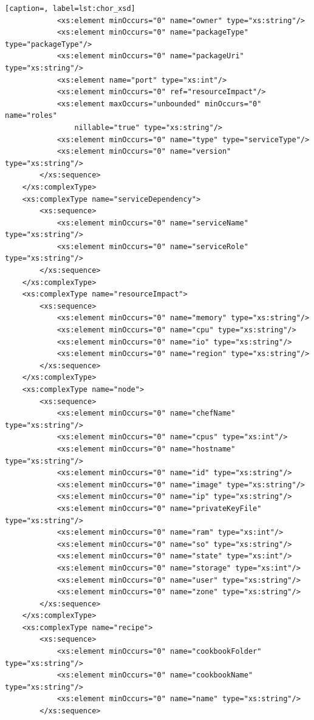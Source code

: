 \documentclass[a4paper, 10pt]{article}
\begin{document}
{\begin{lstlisting}[caption=, label=lst:chor_xsd]
            <xs:element minOccurs="0" name="owner" type="xs:string"/>
            <xs:element minOccurs="0" name="packageType" type="packageType"/>
            <xs:element minOccurs="0" name="packageUri" type="xs:string"/>
            <xs:element name="port" type="xs:int"/>
            <xs:element minOccurs="0" ref="resourceImpact"/>
            <xs:element maxOccurs="unbounded" minOccurs="0" name="roles"
                nillable="true" type="xs:string"/>
            <xs:element minOccurs="0" name="type" type="serviceType"/>
            <xs:element minOccurs="0" name="version" type="xs:string"/>
        </xs:sequence>
    </xs:complexType>
    <xs:complexType name="serviceDependency">
        <xs:sequence>
            <xs:element minOccurs="0" name="serviceName" type="xs:string"/>
            <xs:element minOccurs="0" name="serviceRole" type="xs:string"/>
        </xs:sequence>
    </xs:complexType>
    <xs:complexType name="resourceImpact">
        <xs:sequence>
            <xs:element minOccurs="0" name="memory" type="xs:string"/>
            <xs:element minOccurs="0" name="cpu" type="xs:string"/>
            <xs:element minOccurs="0" name="io" type="xs:string"/>
            <xs:element minOccurs="0" name="region" type="xs:string"/>
        </xs:sequence>
    </xs:complexType>
    <xs:complexType name="node">
        <xs:sequence>
            <xs:element minOccurs="0" name="chefName" type="xs:string"/>
            <xs:element minOccurs="0" name="cpus" type="xs:int"/>
            <xs:element minOccurs="0" name="hostname" type="xs:string"/>
            <xs:element minOccurs="0" name="id" type="xs:string"/>
            <xs:element minOccurs="0" name="image" type="xs:string"/>
            <xs:element minOccurs="0" name="ip" type="xs:string"/>
            <xs:element minOccurs="0" name="privateKeyFile" type="xs:string"/>
            <xs:element minOccurs="0" name="ram" type="xs:int"/>
            <xs:element minOccurs="0" name="so" type="xs:string"/>
            <xs:element minOccurs="0" name="state" type="xs:int"/>
            <xs:element minOccurs="0" name="storage" type="xs:int"/>
            <xs:element minOccurs="0" name="user" type="xs:string"/>
            <xs:element minOccurs="0" name="zone" type="xs:string"/>
        </xs:sequence>
    </xs:complexType>
    <xs:complexType name="recipe">
        <xs:sequence>
            <xs:element minOccurs="0" name="cookbookFolder" type="xs:string"/>
            <xs:element minOccurs="0" name="cookbookName" type="xs:string"/>
            <xs:element minOccurs="0" name="name" type="xs:string"/>
        </xs:sequence>

\end{lstlisting}}
\end{document}
